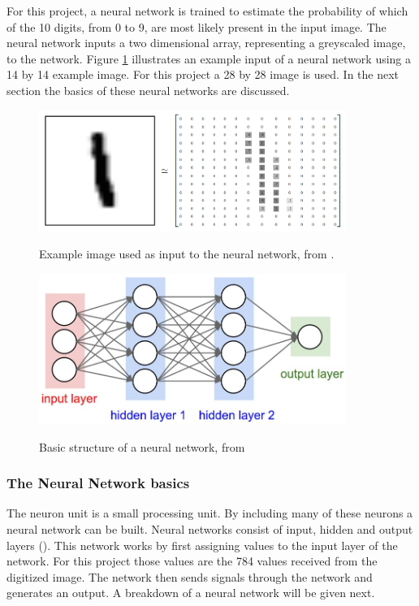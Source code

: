 For this project, a neural network is trained to estimate the probability of which of the 10 digits, from 0 to 9, are most likely present in the input image. The neural network inputs a two dimensional array, representing a greyscaled image, to the network. Figure \ref{fig:mnist} illustrates an example input of a neural network using a 14 by 14 example image. For this project a 28 by 28 image is used. In the next section the basics of these neural networks are discussed.

\begin{figure}
  \centering
  \includegraphics[width=10cm]{MNIST}\\
  \caption{Example image used as input to the neural network, from \citet{tensor2017}.}
  \label{fig:mnist}
\end{figure}

\begin{figure}
  \centering
  \includegraphics[width=10cm]{NN}\\
  \caption{Basic structure of a neural network, from \citet{karpathy2017}}%
  \label{fig:nn}
\end{figure}

\subsubsection{The Neural Network basics}

The neuron unit is a small processing unit. By including many of these neurons a neural network can be built. Neural networks consist of input, hidden and output layers (\citet{MichealN2015}). This network works by first assigning values to the input layer of the network. For this project those values are the 784 values received from the digitized image. The network then sends signals through the network and generates an output. A breakdown of a neural network will be given next.

